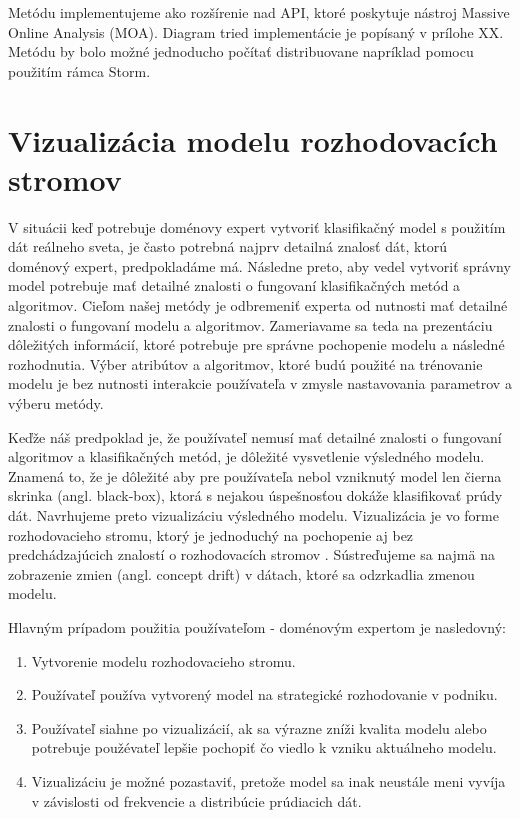 \par
Metódu implementujeme ako rozšírenie nad API, ktoré poskytuje nástroj Massive Online Analysis (MOA). Diagram tried implementácie je popísaný v prílohe XX.%
 Metódu by bolo možné jednoducho počítať distribuovane napríklad pomocu použitím rámca Storm.


\chapter{Vizualizácia modelu rozhodovacích stromov}
\label{my-method-prezentacia-vysledkov}
V situácii keď potrebuje doménovy expert vytvoriť klasifikačný model s použitím dát reálneho sveta, je často potrebná najprv detailná znalosť dát, ktorú doménový expert, predpokladáme má.  Následne preto, aby vedel vytvoriť správny model potrebuje mať detailné znalosti o fungovaní klasifikačných metód a algoritmov. Cieľom našej metódy je odbremeniť experta od nutnosti mať detailné znalosti o fungovaní modelu a algoritmov. Zameriavame sa teda na prezentáciu dôležitých informácií, ktoré potrebuje pre správne pochopenie modelu a následné rozhodnutia. Výber atribútov a algoritmov, ktoré budú použité na trénovanie modelu je bez nutnosti interakcie používateľa v zmysle nastavovania parametrov a výberu metódy. 
\par
Keďže náš predpoklad je, že používateľ nemusí mať detailné znalosti o fungovaní algoritmov a klasifikačných metód, je dôležité vysvetlenie výsledného modelu. Znamená to, že je dôležité aby pre používateľa nebol vzniknutý model len čierna skrinka (angl. black-box), ktorá s nejakou úspešnosťou dokáže klasifikovať prúdy dát. Navrhujeme preto vizualizáciu výsledného modelu. Vizualizácia je vo forme rozhodovacieho stromu, ktorý je jednoduchý na pochopenie aj bez predchádzajúcich znalostí o rozhodovacích stromov \citep{nguyen2015survey}. Sústreďujeme sa najmä na zobrazenie zmien (angl. concept drift) v dátach, ktoré sa odzrkadlia zmenou modelu.
\par
Hlavným prípadom použitia používateľom - doménovým expertom je nasledovný:
\begin{enumerate}
	\item Vytvorenie modelu rozhodovacieho stromu.
	\item Používateľ používa vytvorený model na strategické rozhodovanie v podniku.
	\item Používateľ siahne po vizualizácií, ak sa výrazne zníži kvalita modelu alebo potrebuje použévateľ lepšie pochopiť čo viedlo k vzniku aktuálneho modelu.
	\item Vizualizáciu je možné pozastaviť, pretože model sa inak neustále meni vyvíja v závislosti od frekvencie a distribúcie prúdiacich dát.
\end{enumerate}

